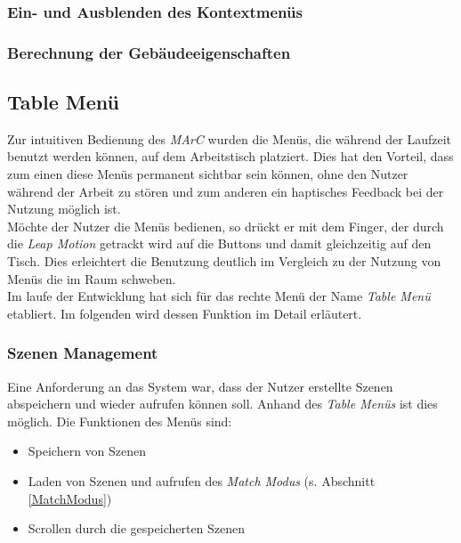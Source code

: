 \subsubsection{Ein- und Ausblenden des Kontextmenüs} \label{sec:KontextMenuSwitch}
\subsubsection{Berechnung der Gebäudeeigenschaften} \label{sec:KontextMenuInhalt}

\subsection{Table Menü}\label{sec:TableMenü}

Zur intuitiven Bedienung des \textit{MArC} wurden die Menüs, die während der Laufzeit benutzt werden können, auf dem Arbeitstisch platziert. Dies hat den Vorteil, dass zum einen diese Menüs permanent sichtbar sein können, ohne den Nutzer während der Arbeit zu stören und zum anderen ein haptisches Feedback bei der Nutzung möglich ist.\\
Möchte der Nutzer die Menüs bedienen, so drückt er mit dem Finger, der durch die \textit{Leap Motion} getrackt wird auf die Buttons und damit gleichzeitig auf den Tisch. Dies erleichtert die Benutzung deutlich im Vergleich zu der Nutzung von Menüs die im Raum schweben.\\
Im laufe der Entwicklung hat sich für das rechte Menü der Name \textit{Table Menü} etabliert. Im folgenden wird dessen Funktion im Detail erläutert.

\subsubsection{Szenen Management}
Eine Anforderung an das System war, dass der Nutzer erstellte Szenen abspeichern und wieder aufrufen können soll. Anhand des \textit{Table Menüs} ist dies möglich. Die Funktionen des Menüs sind:
\begin{itemize}
	\item Speichern von Szenen
	\item Laden von Szenen und aufrufen des \textit{Match Modus} (s. Abschnitt \ref{MatchModus})
	\item Scrollen durch die gespeicherten Szenen

\end{itemize}



